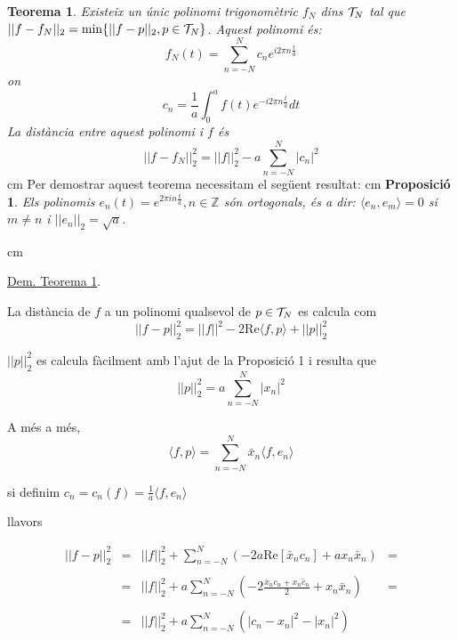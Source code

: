 \documentclass{article}
\def\Z{\mathbb Z}
\begin{document}
\vskip 0.2cm
\noindent
\textbf{Teorema 1}. {\it 
Existeix un \'unic polinomi trigonom\`etric $f_N$ dins 
${\cal T}_N$ tal que $||f-f_N||_2=\mathrm{min}\{||f-p||_2, p\in {\cal T}_N \}$.
\newline
\noindent
Aquest polinomi \'es: 
\begin{equation}
\label{eq1}
f_N(t)=\sum_{n=-N}^N c_n e^{i 2 \pi n \frac{t}{a}}
\end{equation}
\noindent
on 
\begin{equation}
\label{eq2}
c_n=\frac{1}{a} \int_0^a f(t) e^{- i 2 \pi n \frac{t}{a}} dt
\end{equation}
La dist\`ancia entre aquest polinomi i $f$ \'es
\begin{equation}
\label{eq3}
||f-f_N||^2_2=||f||^2_2-a\sum_{n=-N}^N |c_n|^2
\end{equation}
}
 cm
\noindent
Per demostrar aquest teorema necessitam el seg\"uent resultat:
 cm
\noindent
\textbf{Proposici\'o 1}. {\it
Els polinomis $e_n(t)=e^{2 \pi i n \frac{t}{a}}, n \in \Z$ s\'on 
ortogonals, \'es a dir: $\langle e_n, e_m \rangle = 0$ si $m \neq n$
i $||e_n||_2=\sqrt{a}$.
}

 cm

\noindent
\underline{Dem. Teorema 1}.

La dist\`ancia de $f$ a un polinomi qualsevol de $p\in {\cal T}_N$ es calcula 
com
\[
||f-p||^2_2=||f||^2-2\mathrm{Re} \langle f, p \rangle + ||p||^2_2
\]

\noindent
$||p||^2_2$ es calcula f\`acilment amb l'ajut de la Proposici\'o 1 i resulta
que 
\[||p||^2_2=a \sum_{n=-N}^N |x_n|^2\]

\noindent
A m\'es a m\'es, 
\[\langle f, p \rangle = \sum_{n=-N}^N \bar{x}_n \langle f, e_n \rangle\]

\noindent
si definim $c_n=c_n(f)=\frac{1}{a} \langle f, e_n \rangle$

\noindent
llavors

\[ 
\begin{array}{lclc}
||f-p||^2_2 & = & ||f||^2_2 + \sum_{n=-N}^N ( -2a \mathrm{Re}[\bar{x}_n c_n] + 
a x_n \bar{x}_n ) & = \\
\\
 & = & ||f||^2_2 +a \sum_{n=-N}^N (-2 \frac{\bar{x}_n c_n + 
x_n \bar{c}_n}{2} + x_n \bar{x}_n) & = \\
\\
 & = & ||f||^2_2+a \sum_{n=-N}^N (|c_n - x_n|^2 - |x_n|^2)
\end{array}
\]
\end{document}
